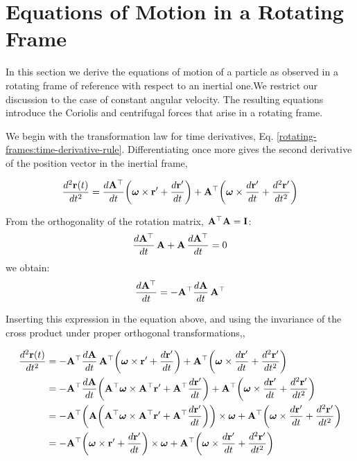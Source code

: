 \documentclass[12pt]{article}
\begin{document}
\section{Equations of Motion in a Rotating Frame}

In this section we derive the equations of motion of a particle as observed in a rotating frame of reference
with respect to an inertial one.We restrict our discussion to the case of constant angular velocity. The resulting equations
 introduce the Coriolis and centrifugal forces that arise in a rotating frame.\par

We begin with the transformation law for time derivatives, Eq. \eqref{rotating-frames:time-derivative-rule}.
Differentiating once more gives the second derivative of the position vector in the inertial frame,

\[
  \frac{d^2\vb{r}(t)}{dt^2} =
    \frac{d\vb{A}^\top}{dt}\!\left(\boldsymbol{\omega}\times\vb{r}' + \frac{d\vb{r}'}{dt}\right)
    + \vb{A}^\top\!\left(\boldsymbol{\omega}\times\frac{d\vb{r}'}{dt} + \frac{d^2\vb{r}'}{dt^2}\right)
\]

From the orthogonality of the rotation matrix, $\vb{A}^\top\vb{A} = \vb{I}$:
\[
  \frac{d\vb{A}^\top}{dt}\,\vb{A} + \vb{A}\,\frac{d\vb{A}^\top}{dt} = 0
\]
we obtain:
\[
  \frac{d\vb{A}^\top}{dt} = -\vb{A}^\top\frac{d\vb{A}}{dt}\,\vb{A}^\top
\]

Inserting this expression in the equation above, and using the invariance of the cross product under proper orthogonal transformations,,

\[
  \begin{aligned}
    \frac{d^2\vb{r}(t)}{dt^2}
    &= -\vb{A}^\top\frac{d\vb{A}}{dt}\,\vb{A}^\top
       \!\left(\boldsymbol{\omega}\times\vb{r}' + \frac{d\vb{r}'}{dt}\right)
       + \vb{A}^\top\!\left(\boldsymbol{\omega}\times\frac{d\vb{r}'}{dt} + \frac{d^2\vb{r}'}{dt^2}\right) \\
    &= -\vb{A}^\top\frac{d\vb{A}}{dt}
       \!\left(\vb{A}^\top\boldsymbol{\omega}\times\vb{A}^\top\vb{r}'
         + \vb{A}^\top\frac{d\vb{r}'}{dt}\right)
       + \vb{A}^\top\!\left(\boldsymbol{\omega}\times\frac{d\vb{r}'}{dt} + \frac{d^2\vb{r}'}{dt^2}\right) \\
    &= -\vb{A}^\top\!\left(\vb{A}\!\left(\vb{A}^\top\boldsymbol{\omega}\times\vb{A}^\top\vb{r}'
         + \vb{A}^\top\frac{d\vb{r}'}{dt}\right)\right)\times\boldsymbol{\omega}
       + \vb{A}^\top\!\left(\boldsymbol{\omega}\times\frac{d\vb{r}'}{dt} + \frac{d^2\vb{r}'}{dt^2}\right) \\
    &= -\vb{A}^\top\!\left(\boldsymbol{\omega}\times\vb{r}' + \frac{d\vb{r}'}{dt}\right)\times\boldsymbol{\omega}
       + \vb{A}^\top\!\left(\boldsymbol{\omega}\times\frac{d\vb{r}'}{dt} + \frac{d^2\vb{r}'}{dt^2}\right)
  \end{aligned}
\]
\end{document}

